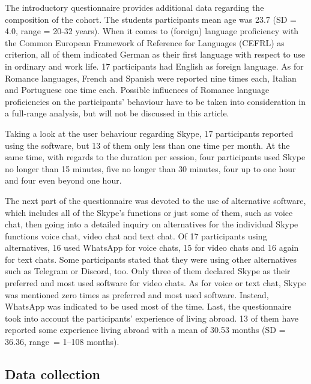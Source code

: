 \documentclass[output=paper]{langscibook}
\begin{document}
The introductory questionnaire provides additional data regarding the composition of the cohort. The students participants mean age was 23.7 (SD = 4.0, range = 20-32 years). When it comes to (foreign) language proficiency with the Common European Framework of Reference for Languages (CEFRL) as criterion, all of them indicated German as their first language with respect to use in ordinary and work life. 17 participants had English as foreign language. As for Romance languages, French and Spanish were reported nine times each, Italian and Portuguese one time each. Possible influences of Romance language proficiencies on the participants' behaviour have to be taken into consideration in a full-range analysis, but will not be discussed in this article.

Taking a look at the user behaviour regarding Skype, 17 participants reported using the software, but 13 of them only less than one time per month. At the same time, with regards to the duration per session, four participants used Skype no longer than 15 minutes, five no longer than 30 minutes, four up to one hour and four even beyond one hour.\largerpage

The next part of the questionnaire was devoted to the use of alternative software, which includes all of the Skype's functions or just some of them, such as voice chat, then going into a detailed inquiry on alternatives for the individual Skype functions voice chat, video chat and text chat. Of 17 participants using alternatives, 16 used WhatsApp for voice chats, 15 for video chats and 16 again for text chats. Some participants stated that they were using other alternatives such as Telegram or Discord, too. Only three of them declared Skype as their preferred and most used software for video chats. As for voice or text chat, Skype was mentioned zero times as preferred and most used software. Instead, WhatsApp was indicated to be used most of the time.
Last, the questionnaire took into account the participants' experience of living abroad. 13 of them have reported some experience living abroad with a mean of 30.53 months (SD =  36.36, range~= 1--108 months).
 



\subsection{Data collection}
\label{subsec:datacol}
\end{document}
